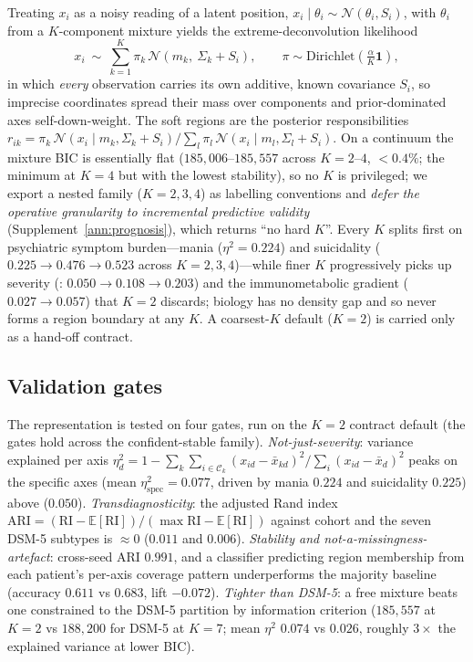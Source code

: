 Treating $x_i$ as a noisy reading of a latent position,
$x_i\mid\theta_i\sim\mathcal N(\theta_i,S_i)$, with $\theta_i$ from a $K$-component
mixture yields the extreme-deconvolution likelihood~\citep{bovy2011xd}
\begin{equation}
  x_i\ \sim\ \sum_{k=1}^{K}\pi_k\,\mathcal{N}\!\left(m_k,\ \Sigma_k+S_i\right),
  \qquad \pi\sim\mathrm{Dirichlet}\!\left(\tfrac{\alpha}{K}\mathbf 1\right),
  \label{eqB:xd}
\end{equation}
in which \emph{every} observation carries its own additive, known covariance $S_i$, so
imprecise coordinates spread their mass over components and prior-dominated axes
self-down-weight. The soft regions are the posterior responsibilities
$r_{ik}=\pi_k\,\mathcal N(x_i\mid m_k,\Sigma_k+S_i)/\sum_l\pi_l\,\mathcal N(x_i\mid m_l,\Sigma_l+S_i)$.
On a continuum the mixture BIC is essentially flat ($185{,}006$--$185{,}557$ across
$K=2$--$4$, $<0.4\%$; the minimum at $K=4$ but with the lowest stability), so no $K$ is
privileged; we export a nested family ($K=2,3,4$) as labelling conventions and
\emph{defer the operative granularity to incremental predictive validity}
(Supplement~\ref{ann:prognosis}), which returns ``no hard $K$''. Every $K$ splits first on
psychiatric symptom burden---mania ($\eta^2=0.224$) and suicidality ($0.225\!\to\!0.476\!\to\!0.523$
across $K=2,3,4$)---while finer $K$ progressively picks up severity (\Gfac{}:
$0.050\!\to\!0.108\!\to\!0.203$) and the immunometabolic gradient ($0.027\!\to\!0.057$)
that $K=2$ discards; biology has no density gap and so never forms a region boundary at
any $K$. A coarsest-$K$ default ($K=2$) is carried only as a hand-off contract.

\subsection{Validation gates}

The representation is tested on four gates, run on the $K=2$ contract default (the gates
hold across the confident-stable family). \emph{Not-just-severity}: variance explained
per axis
$\eta^2_d=1-\sum_k\sum_{i\in\mathcal C_k}(x_{id}-\bar x_{kd})^2/\sum_i(x_{id}-\bar x_d)^2$
peaks on the specific axes (mean $\eta^2_{\text{spec}}=0.077$, driven by mania $0.224$ and
suicidality $0.225$) above \Gfac{} ($0.050$). \emph{Transdiagnosticity}: the adjusted Rand
index
$\mathrm{ARI}=(\mathrm{RI}-\mathbb E[\mathrm{RI}])/(\max\mathrm{RI}-\mathbb E[\mathrm{RI}])$
against cohort and the seven DSM-5 subtypes is $\approx0$ ($0.011$ and $0.006$).
\emph{Stability and not-a-missingness-artefact}: cross-seed ARI $0.991$, and a
classifier predicting region membership from each patient's per-axis coverage pattern
underperforms the majority baseline (accuracy $0.611$ vs $0.683$, lift $-0.072$).
\emph{Tighter than DSM-5}: a free mixture beats one constrained to the DSM-5 partition
by information criterion ($185{,}557$ at $K=2$ vs $188{,}200$ for DSM-5 at $K=7$; mean
$\eta^2$ $0.074$ vs $0.026$, roughly $3\times$ the explained variance at lower BIC).

